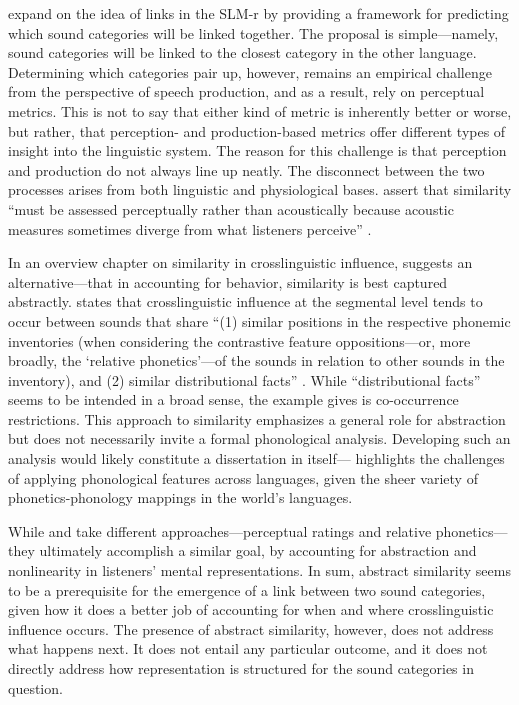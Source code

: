 \citet{flege_2021_slmr} expand on the idea of links in the SLM-r by providing a framework for predicting which sound categories will be linked together. The proposal is simple---namely, sound categories will be linked to the closest category in the other language. Determining which categories pair up, however, remains an empirical challenge from the perspective of speech production, and as a result, \citet{flege_2021_slmr} rely on perceptual metrics. This is not to say that either kind of metric is inherently better or worse, but rather, that perception- and production-based metrics offer different types of insight into the linguistic system. The reason for this challenge is that perception and production do not always line up neatly. The disconnect between the two processes arises from both linguistic and physiological bases. \citeauthor{flege_2021_slmr} assert that similarity ``must be assessed perceptually rather than acoustically because acoustic measures sometimes diverge from what listeners perceive'' \citeyearpar[][p. 33]{flege_2021_slmr}. 

In an overview chapter on similarity in crosslinguistic influence, \citet{chang_2015_similarity} suggests an alternative---that in accounting for behavior, similarity is best captured abstractly. \citeauthor{chang_2015_similarity} states that crosslinguistic influence at the segmental level tends to occur between sounds that share ``(1) similar positions in the respective phonemic inventories (when considering the contrastive feature oppositions---or, more broadly, the `relative phonetics'---of the sounds in relation to other sounds in the inventory), and (2) similar distributional facts'' \citeyearpar[][p. 201]{chang_2015_similarity}. While ``distributional facts'' seems to be intended in a broad sense, the example \citeauthor{chang_2015_similarity} gives is co-occurrence restrictions. This approach to similarity emphasizes a general role for abstraction but does not necessarily invite a formal phonological analysis. Developing such an analysis would likely constitute a dissertation in itself---\citet{mielke_2012_similarity} highlights the challenges of applying phonological features across languages, given the sheer variety of phonetics-phonology mappings in the world's languages. 

While \citet{flege_2021_slmr} and \citet{chang_2015_similarity} take different approaches---perceptual ratings and relative phonetics---they ultimately accomplish a similar goal, by accounting for abstraction and nonlinearity in listeners' mental representations. In sum, abstract similarity seems to be a prerequisite for the emergence of a link between two sound categories, given how it does a better job of accounting for when and where crosslinguistic influence occurs. The presence of abstract similarity, however, does not address what happens next. It does not entail any particular outcome, and it does not directly address how representation is structured for the sound categories in question. 

